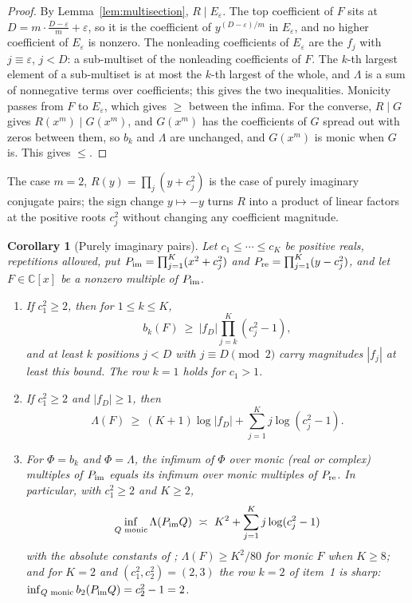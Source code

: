 \documentclass[11pt]{article}
\newtheorem{corollary}[theorem]{Corollary}
\begin{document}
\begin{proof}
By Lemma~\ref{lem:multisection}, $R\mid E_\varepsilon$.  The top coefficient
of $F$ sits at $D=m\cdot\frac{D-\varepsilon}m+\varepsilon$, so it is the
coefficient of $y^{(D-\varepsilon)/m}$ in $E_\varepsilon$, and no higher
coefficient of $E_\varepsilon$ is nonzero.  The nonleading coefficients of
$E_\varepsilon$ are the $f_j$ with $j\equiv\varepsilon$, $j<D$: a
sub-multiset of the nonleading coefficients of $F$.  The $k$-th largest
element of a sub-multiset is at most the $k$-th largest of the whole, and
$\Lambda$ is a sum of nonnegative terms over coefficients; this gives the
two inequalities.  Monicity passes from $F$ to $E_\varepsilon$, which gives
$\ge$ between the infima.  For the converse, $R\mid G$ gives
$R(x^m)\mid G(x^m)$, and $G(x^m)$ has the coefficients of $G$ spread out
with zeros between them, so $b_k$ and $\Lambda$ are unchanged, and
$G(x^m)$ is monic when $G$ is.  This gives $\le$.
\end{proof}

The case $m=2$, $R(y)=\prod_j(y+c_j^2)$ is the case of purely imaginary
conjugate pairs; the sign change $y\mapsto-y$ turns $R$ into a product of
linear factors at the positive roots $c_j^2$ without changing any
coefficient magnitude.

\begin{corollary}[Purely imaginary pairs]\label{cor:imag}
Let $c_1\le\cdots\le c_K$ be positive reals, repetitions allowed, put
$P_{\rm im}=\prod_{j=1}^K(x^2+c_j^2)$ and
$P_{\rm re}=\prod_{j=1}^K(y-c_j^2)$, and let $F\in\mathbb C[x]$ be a nonzero
multiple of $P_{\rm im}$.
\begin{enumerate}
\item If $c_1^2\ge2$, then for $1\le k\le K$,
\[
  b_k(F)\ \ge\ |f_D|\prod_{j=k}^K(c_j^2-1),
\]
and at least $k$ positions $j<D$ with $j\equiv D\pmod2$ carry magnitudes
$|f_j|$ at least this bound.
The row $k=1$ holds for $c_1>1$.
\item If $c_1^2\ge2$ and $|f_D|\ge1$, then
\[
  \Lambda(F)\ \ge\ (K+1)\log|f_D|+\sum_{j=1}^Kj\log(c_j^2-1).
\]
\item For $\Phi=b_k$ and $\Phi=\Lambda$, the infimum of $\Phi$ over monic
(real or complex) multiples of $P_{\rm im}$ equals its infimum over monic
multiples of $P_{\rm re}$.  In particular, with $c_1^2\ge2$ and $K\ge2$,
\[
  \inf_{Q\text{ monic}}\Lambda(P_{\rm im}Q)\ \asymp\
  K^2+\sum_{j=1}^Kj\log(c_j^2-1)
\]
with the absolute constants of \cite[Corollary~4.3]{coefficient-mass};
$\Lambda(F)\ge K^2/80$ for monic $F$ when $K\ge8$; and for $K=2$ and
$(c_1^2,c_2^2)=(2,3)$ the row $k=2$ of item~1 is sharp:
$\inf_{Q\text{ monic}}b_2(P_{\rm im}Q)=c_2^2-1=2$.
\end{enumerate}
\end{corollary}
\end{document}
